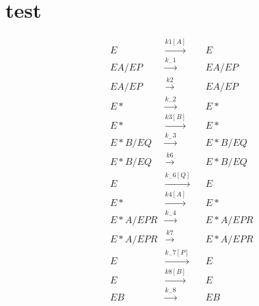 \documentclass[12pt]{article}
\begin{document}
\section{test}
\begin{align*}
    &E &\xrightarrow{k1[A]}& &E\\
    &EA/EP &\xrightarrow{k_-1}& &EA/EP\\
    &EA/EP &\xrightarrow{k2}& &EA/EP\\
    &E* &\xrightarrow{k_-2}& &E*\\
    &E* &\xrightarrow{k3[B]}& &E*\\
    &E*B/EQ &\xrightarrow{k_-3}& &E*B/EQ\\
    &E*B/EQ &\xrightarrow{k6}& &E*B/EQ\\
    &E &\xrightarrow{k_-6[Q]}& &E\\
    &E* &\xrightarrow{k4[A]}& &E*\\
    &E*A/EPR &\xrightarrow{k_-4}& &E*A/EPR\\
    &E*A/EPR &\xrightarrow{k7}& &E*A/EPR\\
    &E &\xrightarrow{k_-7[P]}& &E\\
    &E &\xrightarrow{k8[B]}& &E\\
    &EB &\xrightarrow{k_-8}& &EB\\
    \end{align*}
\end{document}
